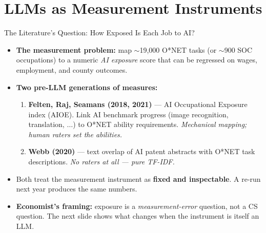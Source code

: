 \section{LLMs as Measurement Instruments}

\begin{frame}{The Literature's Question: How Exposed Is Each Job to AI?}
\begin{itemize}
\item \textbf{The measurement problem:} map $\sim$19{,}000 O*NET tasks (or $\sim$900 SOC occupations) to a numeric \emph{AI exposure} score that can be regressed on wages, employment, and county outcomes.

\medskip
\item \textbf{Two pre-LLM generations of measures:}
\begin{enumerate}
\item \textbf{Felten, Raj, Seamans (2018, 2021)} --- AI Occupational Exposure index (AIOE). Link AI benchmark progress (image recognition, translation, $\ldots$) to O*NET ability requirements. \emph{Mechanical mapping; human raters set the abilities.}
\item \textbf{Webb (2020)} --- text overlap of AI patent abstracts with O*NET task descriptions. \emph{No raters at all --- pure TF-IDF.}
\end{enumerate}

\medskip
\item Both treat the measurement instrument as \textbf{fixed and inspectable}. A re-run next year produces the same numbers.

\medskip
\item \textbf{Economist's framing:} exposure is a \emph{measurement-error} question, not a CS question. The next slide shows what changes when the instrument is itself an LLM.
\end{itemize}
\end{frame}

